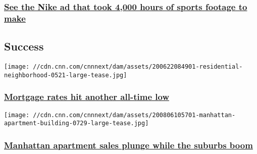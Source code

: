\hypertarget{see-the-nike-ad-that-took-4000-hours-of-sports-footage-to-make}{%
\subsubsection{\texorpdfstring{\href{/videos/business/2020/07/31/nike-you-cant-stop-us-ad-orig.cnn-business}{See
the Nike ad that took 4,000 hours of sports footage to
make}}{See the Nike ad that took 4,000 hours of sports footage to make}}\label{see-the-nike-ad-that-took-4000-hours-of-sports-footage-to-make}}

\href{https://www.cnn.com/business/success}{}

\hypertarget{success}{%
\subsection{Success}\label{success}}

\href{/2020/08/06/success/mortgage-rates-record-low-august/index.html}{}

\texttt{[image: //cdn.cnn.com/cnnnext/dam/assets/200622084901-residential-neighborhood-0521-large-tease.jpg]}

\hypertarget{mortgage-rates-hit-another-all-time-low}{%
\subsubsection{\texorpdfstring{\href{/2020/08/06/success/mortgage-rates-record-low-august/index.html}{Mortgage
rates hit another all-time
low}}{Mortgage rates hit another all-time low}}\label{mortgage-rates-hit-another-all-time-low}}

\href{/2020/08/06/success/manhattan-pending-home-sales-suburbs/index.html}{}

\texttt{[image: //cdn.cnn.com/cnnnext/dam/assets/200806105701-manhattan-apartment-building-0729-large-tease.jpg]}

\hypertarget{manhattan-apartment-sales-plunge-while-the-suburbs-boom}{%
\subsubsection{\texorpdfstring{\href{/2020/08/06/success/manhattan-pending-home-sales-suburbs/index.html}{Manhattan
apartment sales plunge while the suburbs
boom}}{Manhattan apartment sales plunge while the suburbs boom}}\label{manhattan-apartment-sales-plunge-while-the-suburbs-boom}}

\href{/2020/08/06/success/childcare-coronavirus/index.html}{}

